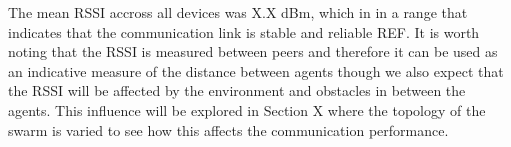 \documentclass[conference]{IEEEtran}
\begin{document}
The mean RSSI accross all devices was X.X dBm, which in in a range that indicates that the communication link is stable and reliable REF. It is worth noting that the RSSI is measured between peers and therefore it can be used as an indicative measure of the distance between agents though we also expect that the RSSI will be affected by the environment and obstacles in between the agents. This influence will be explored in Section X where the topology of the swarm is varied to see how this affects the communication performance.\\

\newpage
\printbibliography
\end{document}
